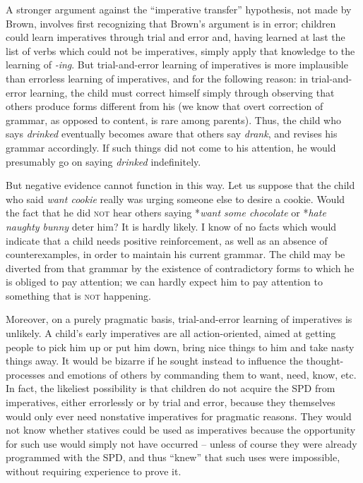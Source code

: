 A stronger argument against the ``imperative transfer'' hypothesis,
not made by Brown, involves first recognizing that Brown's argument is in error; children could learn imperatives through trial and error and, having learned at last the list of verbs which could not be imperatives, simply apply that knowledge to the learning of \textit{-ing}. But trial-and-error learning of imperatives is more implausible than errorless learning of imperatives, and for the following reason: in trial-and-error learning, the child must correct himself simply through observing that others produce forms different from his (we know that overt correction of grammar, as opposed to content, is rare among parents). Thus, the child who says \textit{drinked} eventually becomes aware that others say \textit{drank}, and revises his grammar accordingly. If such things did not come to his attention, he would presumably go on saying \textit{drinked} indefinitely.

But negative evidence cannot function in this way. Let us sup\-pose that the child who said \textit{want cookie} really was urging someone else to desire a cookie. Would the fact that he did \textsc{not} hear others saying *\textit{want some chocolate} or *\textit{hate naughty bunny} deter him? It is hardly likely. I know of no facts which would indicate that a child needs positive reinforcement, as well as an absence of counterexamples, in order to maintain his current grammar. The child may be diverted from that grammar by the existence of contradictory forms to which he is obliged to pay attention; we can hardly expect him to pay atten\-tion to something that is \textsc{not} happening.

Moreover, on a purely pragmatic basis, trial-and-error learning of imperatives is unlikely. A child's early imperatives are all action-oriented, aimed at getting people to pick him up or put him down, bring nice things to him and take nasty things away. It would be bizarre if he sought instead to influence the thought-processes and emotions of others by commanding them to want, need, know, etc. In fact, the likeliest possibility is that children do not acquire the SPD from imperatives, either errorlessly or by trial and error, because they themselves would only ever need nonstative imperatives for pragmatic reasons. They would not know whether statives could be used as imperatives because the opportunity for such use would simply not
have occurred -- unless of course they were already programmed with the SPD, and thus ``knew'' that such uses were impossible, without requiring experience to prove it.

